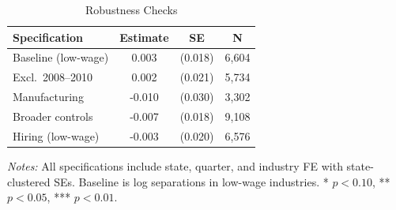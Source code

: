 \begin{table}[H]
\centering
\caption{Robustness Checks}
\label{tab:robustness}
\begin{threeparttable}
\begin{tabular}{lccc}
\toprule
Specification & Estimate & SE & N \\
\midrule
Baseline (low-wage) & 0.003 & (0.018) & 6,604 \\
Excl.\ 2008--2010 & 0.002 & (0.021) & 5,734 \\
Manufacturing & -0.010 & (0.030) & 3,302 \\
Broader controls & -0.007 & (0.018) & 9,108 \\
Hiring (low-wage) & -0.003 & (0.020) & 6,576 \\
\bottomrule
\end{tabular}
\begin{tablenotes}[flushleft]
\small
\item \textit{Notes:} All specifications include state, quarter, and industry FE with state-clustered SEs. Baseline is log separations in low-wage industries. * $p<0.10$, ** $p<0.05$, *** $p<0.01$.
\end{tablenotes}
\end{threeparttable}
\end{table}

